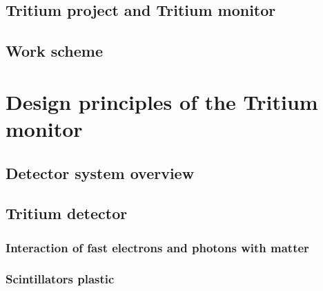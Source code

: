 \documentclass[12pt,a4paper]{book}
\begin{document}
	\section{Tritium project and Tritium monitor}
	\label{sec:TritiumProject}
	\newpage
	
	\section{Work scheme}
	\newpage	
	
\chapter[Design principles]{Design principles of the Tritium monitor}\label{chap:DesignPrinciples}
	\section{Detector system overview}
	 \label{sec:MonitorOverview}
	\newpage
	
	\section{Tritium detector}
	 \label{sec:TritiumDectectorIntro}
	\newpage
	
		\subsection[Interaction of particles with matter]{Interaction of fast electrons and photons with matter}
		 \label{subsec:Interaction}
					
		\subsection{Scintillators plastic} %
		\label{subsec:PlasticScintillators}
		
			
\end{document}
